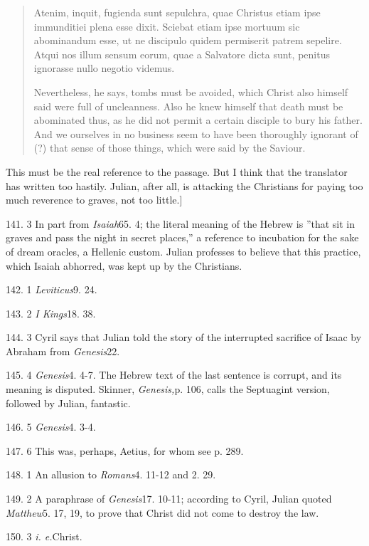 \begin{quote}

Atenim, inquit, fugienda sunt sepulchra, quae Christus etiam ipse immunditiei
plena esse dixit. Sciebat etiam ipse mortuum sic abominandum esse, ut ne
discipulo quidem permiserit patrem sepelire. Atqui nos illum sensum eorum,
quae a Salvatore dicta sunt, penitus ignorasse nullo negotio videmus.

Nevertheless, he says, tombs must be avoided, which Christ also himself said
were full of uncleanness. Also he knew himself that death must be abominated
thus, as he did not permit a certain disciple to bury his father. And we
ourselves in no business seem to have been thoroughly ignorant of (?) that
sense of those things, which were said by the Saviour.

\end{quote}

This must be the real reference to the passage. But I think that the translator
has written too hastily. Julian, after all, is attacking the Christians for
paying too much reverence to graves, not too little.]

141. 3 In part from \emph{Isaiah}65. 4; the literal meaning of the Hebrew is ''that sit in graves and pass the night in secret places,'' a reference to incubation for the sake of dream oracles, a Hellenic custom. Julian professes to believe that this practice, which Isaiah abhorred, was kept up by the Christians.

142. 1 \emph{Leviticus}9. 24.

143. 2 \emph{I Kings}18. 38.

144. 3 Cyril says that Julian told the story of the interrupted sacrifice of Isaac by Abraham from \emph{Genesis}22.

145. 4 \emph{Genesis}4. 4-7. The Hebrew text of the last sentence is corrupt, and its meaning is disputed. Skinner, \emph{Genesis,}p. 106, calls the Septuagint version, followed by Julian, fantastic.

146. 5 \emph{Genesis}4. 3-4.

147. 6 This was, perhaps, Aetius, for whom see p. 289.

148. 1 An allusion to \emph{Romans}4. 11-12 and 2. 29.

149. 2 A paraphrase of \emph{Genesis}17. 10-11; according to Cyril, Julian quoted \emph{Matthew}5. 17, 19, to prove that Christ did not come to destroy the law.

150. 3 \emph{i. e.}Christ.

